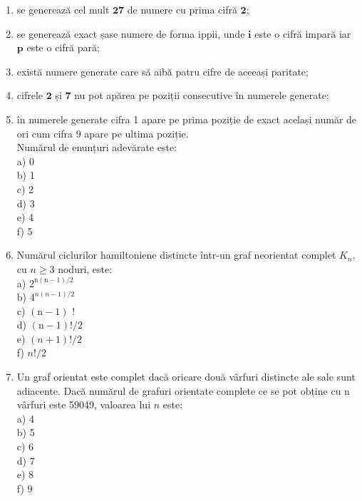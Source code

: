 \documentclass[10pt]{article}
\begin{document}
\begin{enumerate}
  \item se generează cel mult $\mathbf{2 7}$ de numere cu prima cifră $\mathbf{2}$;
  \item se generează exact șase numere de forma ippii, unde $\boldsymbol{i}$ este o cifră impară iar $\boldsymbol{p}$ este o cifră pară;
  \item există numere generate care să aibă patru cifre de aceeași paritate;
  \item cifrele $\mathbf{2}$ și $\mathbf{7}$ nu pot apărea pe poziții consecutive în numerele generate;
  \item în numerele generate cifra 1 apare pe prima poziție de exact același număr de ori cum cifra 9 apare pe ultima poziție.\\
Numărul de enunțuri adevărate este:\\
a) 0\\
b) 1\\
c) 2\\
d) 3\\
e) 4\\
f) 5
  \item Numărul ciclurilor hamiltoniene distincte într-un graf neorientat complet $K_{n}$, cu $n \geq 3$ noduri, este:\\
a) $2^{\mathrm{n}(\mathrm{n}-1) / 2}$\\
b) $4^{n(n-1) / 2}$\\
c) $(\mathrm{n}-1)$ !\\
d) $(\mathrm{n}-1)!/ 2$\\
e) $(n+1)!/ 2$\\
f) $n!/ 2$
  \item Un graf orientat este complet dacă oricare două vârfuri distincte ale sale sunt adiacente. Dacă numărul de grafuri orientate complete ce se pot obține cu n vârfuri este 59049, valoarea lui $n$ este:\\
a) 4\\
b) 5\\
c) 6\\
d) 7\\
e) 8\\
f) 9
\end{enumerate}
\end{document}
